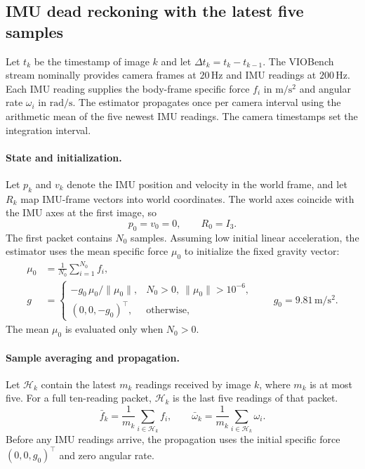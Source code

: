 \subsection{IMU dead reckoning with the latest five samples}
\label{sec:imu-avg5}

Let $t_k$ be the timestamp of image $k$ and let
$\Delta t_k=t_k-t_{k-1}$. The VIOBench stream nominally provides camera
frames at $20\,\mathrm{Hz}$ and IMU readings at $200\,\mathrm{Hz}$.
Each IMU reading supplies the body-frame specific force $f_i$ in
$\mathrm{m/s^2}$ and angular rate $\omega_i$ in $\mathrm{rad/s}$.
The estimator propagates once per camera interval using the arithmetic
mean of the five newest IMU readings. The camera timestamps set the
integration interval.

\paragraph{State and initialization.}
Let $p_k$ and $v_k$ denote the IMU position and velocity in the world frame,
and let $R_k$ map IMU-frame vectors into world coordinates. The world axes
coincide with the IMU axes at the first image, so
\begin{equation}
    p_0=v_0=0,\qquad R_0=I_3.
\end{equation}
The first packet contains $N_0$ samples. Assuming low initial linear
acceleration, the estimator uses the mean specific force $\mu_0$ to
initialize the fixed gravity vector:
\begin{align}
    \mu_0 &= \frac{1}{N_0}\sum_{i=1}^{N_0} f_i, \\
    g &=
    \begin{cases}
        -g_0\,\mu_0/\lVert\mu_0\rVert,
            & N_0>0,\ \lVert\mu_0\rVert>10^{-6},\\
        (0,0,-g_0)^\top, & \text{otherwise},
    \end{cases}
    \qquad g_0=9.81\,\mathrm{m/s^2}.
\end{align}
The mean $\mu_0$ is evaluated only when $N_0>0$.

\paragraph{Sample averaging and propagation.}
Let $\mathcal H_k$ contain the latest $m_k$ readings received by image
$k$, where $m_k$ is at most five. For a full ten-reading packet,
$\mathcal H_k$ is the last five readings of that packet.
\begin{equation}
    \bar f_k=\frac{1}{m_k}\sum_{i\in\mathcal H_k} f_i,
    \qquad
    \bar\omega_k=\frac{1}{m_k}\sum_{i\in\mathcal H_k}\omega_i .
\end{equation}
Before any IMU readings arrive, the propagation uses the initial
specific force $(0,0,g_0)^\top$ and zero angular rate.


